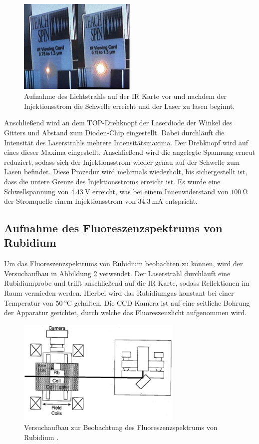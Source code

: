 \begin{figure} 
    \centering
    \includegraphics[width=0.5\textwidth]{pics/Lasen}
    \caption{Aufnahme des Lichtstrahls auf der IR Karte vor und nachdem der Injektionsstrom die Schwelle erreicht und der Laser zu lasen beginnt.}    
    \label{abb:afig2}
\end{figure}

Anschließend wird an dem TOP-Drehknopf der Laserdiode der Winkel des Gitters und Abstand zum Dioden-Chip eingestellt.
Dabei durchläuft die Intensität des Laserstrahls mehrere Intensitätsmaxima.
Der Drehknopf wird auf eines dieser Maxima eingestellt. 
Anschließend wird die angelegte Spannung erneut reduziert, sodass sich der Injektionsstrom wieder genau auf der Schwelle zum Lasen befindet.
Diese Prozedur wird mehrmals wiederholt, bis sichergestellt ist, dass die untere Grenze des Injektionsstroms erreicht ist.
Es wurde eine Schwellspannung von $\SI{4,43}{\V}$ erreicht, was bei einem Innenwiderstand von $\SI{100}{\ohm}$ der Stromquelle einem Injektionsstrom von $\SI{34,3}{\mA}$ entspricht.

\subsection{Aufnahme des Fluoreszenzspektrums von Rubidium}
Um das Fluoreszenzspektrums von Rubidium beobachten zu können, wird der Versuchaufbau in Abbildung \ref{abb:afig3} verwendet.
Der Laserstrahl durchläuft eine Rubidiumprobe und trifft anschließend auf die IR Karte, sodass Reflektionen im Raum vermieden werden.
Hierbei wird das Rubidiumgas konstant bei einer Temperatur von $\SI{50}{\celsius}$ gehalten.
Die CCD Kamera ist auf eine seitliche Bohrung der Apparatur gerichtet, durch welche das Fluoreszenzlicht aufgenommen wird.

\begin{figure}
    \centering
    \includegraphics[width=0.7\textwidth]{pics/aufbau2}
    \caption{Versuchaufbau zur Beobachtung des Fluoreszenzspektrums von Rubidium \cite{anleitung}.}
    \label{abb:afig3}
\end{figure}

